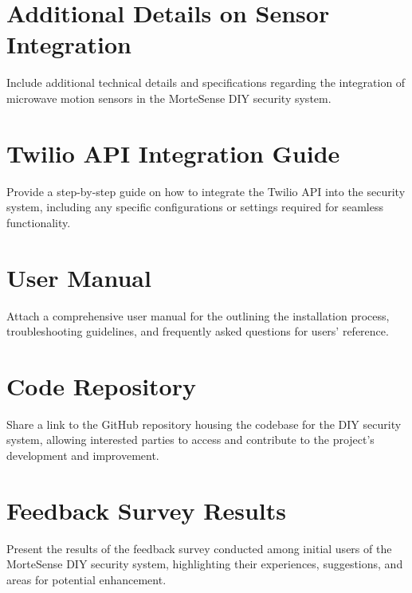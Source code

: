 \appendices


\section{Additional Details on Sensor Integration}\label{sec:additional-details-on-sensor-integration}
Include additional technical details and specifications regarding the integration of microwave motion sensors in the MorteSense DIY security system.


\section{Twilio API Integration Guide}\label{sec:twilio-api-integration-guide}
Provide a step-by-step guide on how to integrate the Twilio API into the security system, including any specific configurations or settings required for seamless functionality.


\section{User Manual}\label{sec:user-manual}
Attach a comprehensive user manual for the \brand{} \project{} outlining the installation process, troubleshooting guidelines, and frequently asked questions for users' reference.


\section{Code Repository}\label{sec:code-repository}
Share a link to the GitHub repository housing the codebase for the \MS DIY security system, allowing interested parties to access and contribute to the project's development and improvement.


\section{Feedback Survey Results}\label{sec:feedback-survey-results}
Present the results of the feedback survey conducted among initial users of the MorteSense DIY security system, highlighting their experiences, suggestions, and areas for potential enhancement.
